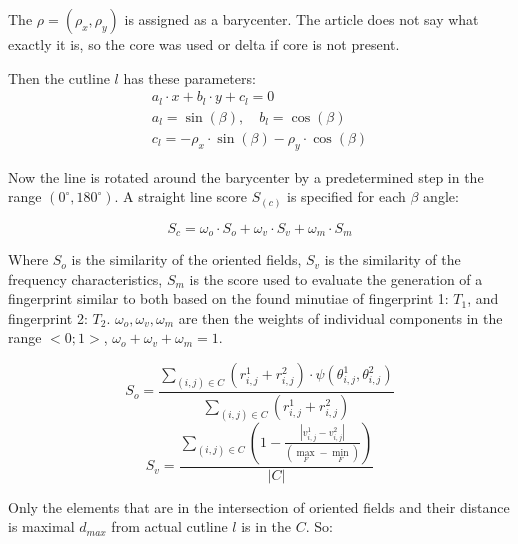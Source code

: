 The $ \rho = (\rho_x, \rho_y) $ is assigned as a barycenter. The article does not say what exactly it is, so the core was used or delta if core is not present. \cite{morphing_paper}

Then the cutline $l$ has these parameters: \cite{morphing_paper}
\begin{equation}
    \begin{array}{l}
    a_{l} \cdot x+b_{l} \cdot y+c_{l}=0 \\
    a_{l}=\sin (\beta), \quad b_{l}=\cos (\beta) \\
    c_{l}=-\rho_{x} \cdot \sin (\beta)-\rho_{y} \cdot \cos (\beta)
    \end{array}
\end{equation}

Now the line is rotated around the barycenter by a predetermined step in the range $ (0^{\circ}, 180^{\circ}) $. A straight line score $S_(c)$ is specified for each $\beta$ angle: \cite{morphing_paper}

\begin{equation}
    S_{c}=\omega_{o} \cdot S_{o}+\omega_{v} \cdot S_{v}+\omega_{m} \cdot S_{m}
\end{equation}

Where $S_o$ is the similarity of the oriented fields, $S_v$ is the similarity of the frequency characteristics, $S_m$ is the score used to evaluate the generation of a fingerprint similar to both based on the found minutiae of fingerprint 1: $ T_1 $, and fingerprint 2: $ T_2 $. $ \omega_{o}, \omega_{v}, \omega_{m} $ are then the weights of individual components in the range $ <0; 1> $, $ \omega_{o} + \omega_{v} + \omega_{m} = 1$. \cite{morphing_paper}

\begin{equation}
    S_{o}=\frac{\sum_{(i, j) \in C}\left(r_{i, j}^{1}+r_{i, j}^{2}\right) \cdot \psi\left(\theta_{i, j}^{1}, \theta_{i, j}^{2}\right)}{\sum_{(i, j) \in C}\left(r_{i, j}^{1}+r_{i, j}^{2}\right)}
\end{equation}
\begin{equation}
    S_{v}=\frac{\sum_{(i, j) \in C}\left(1-\frac{\left|v_{i, j}^{1}-v_{i, j}^{2}\right|}{\left(\max _{F}-\min _{F}\right)}\right)}{|C|}
\end{equation}

Only the elements that are in the intersection of oriented fields and their distance is maximal $d_{max}$ from actual cutline $l$ is in the $C$. So: \cite{morphing_paper}

